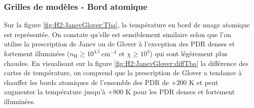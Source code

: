 \subsubsection{Grilles de modèles - Bord atomique}

Sur la figure \ref{fig:H2:JanevGlover:Tba}, la température en bord de nuage atomique est représentée. On constate qu'elle est sensiblement similaire selon que l'on utilise la prescription de Janev ou de Glover à l'exception des PDR denses et fortement illuminées ($n_\mathrm{H} \geq 10^{4.5} \, \mathrm{cm}^{-3}$ et $\chi \geq 10^3$) qui sont légèrement plus chaudes. En visualisant sur la figure \ref{fig:H2:JanevGlover:diffTba} la différence des cartes de température, on comprend que la prescription de Glover a tendance à chauffer les bords atomiques de l'ensemble des PDR de $+200$ K et peut augmenter la température jusqu'à $+800$ K pour les PDR denses et fortement illuminées. \newline


